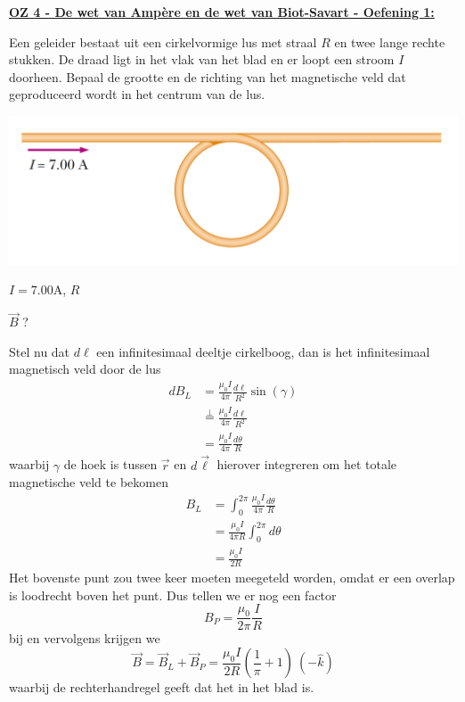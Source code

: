 \textbf{\underline{OZ 4 - De wet van Ampère en de wet van Biot-Savart - Oefening 1:}}
\vspace{0.5cm}

Een geleider bestaat uit een cirkelvormige lus met straal $R$ en twee lange rechte stukken. De draad ligt in het vlak van het blad en er loopt een stroom $I$ doorheen. Bepaal de grootte en de richting van het magnetische veld dat geproduceerd wordt in het centrum van de lus.

\begin{center}
    \includegraphics[scale = 0.5]{oz04/resources/Oz4Oef1.png}
\end{center}

\begin{description}[labelwidth=1.5cm, leftmargin=!]
    \item[Geg. :]   $I = 7.00$A, $R$
    \item[Gevr. :]  $\Vec{B}$ ?
    \item[Opl. :]  
    Stel nu dat $d\ell$ een infinitesimaal deeltje cirkelboog, dan is het infinitesimaal magnetisch veld door de lus
    \begin{align*}
        dB_L
            &= \frac{\mu_0I}{4\pi}\frac{d\ell}{R^2}\sin(\gamma)\\
            &\overset{\perp}{=} \frac{\mu_0I}{4\pi}\frac{d\ell}{R^2}\\
            &= \frac{\mu_0I}{4\pi}\frac{d\theta}{R} 
    \end{align*}
    waarbij $\gamma$ de hoek is tussen $\Vec{r}$ en $d\Vec{\ell}$ hierover integreren om het totale magnetische veld te bekomen
    \begin{align*}
        B_L
            &= \int_{0}^{2\pi} \frac{\mu_0I}{4\pi}\frac{d\theta}{R}  \\
            &= \frac{\mu_0I}{4\pi R} \int_{0}^{2\pi}d\theta \\
            &=  \frac{\mu_0I}{2R}
    \end{align*}
    Het bovenste punt zou twee keer moeten meegeteld worden, omdat er een overlap is loodrecht boven het punt. Dus tellen we er nog een factor
    \begin{equation*}
        B_P = \frac{\mu_0}{2\pi}\frac{I}{R}
    \end{equation*}
    bij en vervolgens krijgen we
    \begin{equation*}
        \Vec{B} = \Vec{B}_L + \Vec{B}_P = \frac{\mu_0I}{2R}\left(\frac{1}{\pi} + 1\right) \ (-\hat{k})
    \end{equation*}
    waarbij de rechterhandregel geeft dat het in het blad is.
\end{description}

\vspace{1cm}